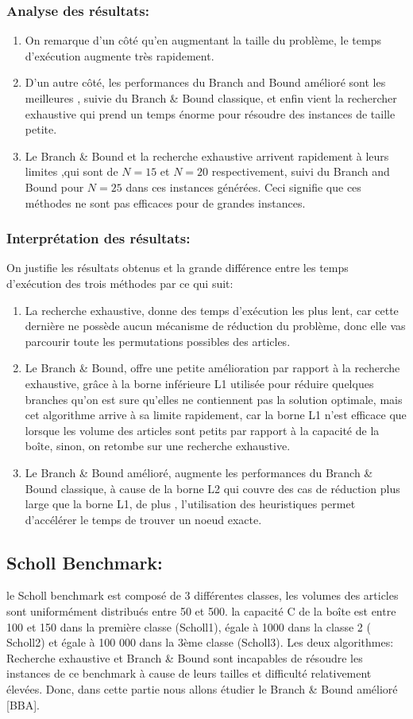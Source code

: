 \documentclass[12pt]{article}
\begin{document}
\subsubsection{Analyse des résultats:}
\begin{enumerate}
    \item On remarque d’un côté qu’en augmentant la taille du problème, le temps d'exécution augmente très rapidement.
    \item D’un autre côté, les performances du Branch and Bound amélioré sont les meilleures , suivie du Branch \& Bound classique, et enfin vient la rechercher exhaustive qui prend un temps énorme pour résoudre des instances de taille petite. 
    \item Le Branch \& Bound et la recherche exhaustive arrivent rapidement à leurs limites ,qui sont de \(N=15\) et \(N=20\) respectivement, suivi du Branch and Bound pour \(N=25\) dans ces instances générées. Ceci signifie que ces méthodes ne sont pas efficaces pour de grandes instances.
\end{enumerate}
\subsubsection{Interprétation des résultats:}
On justifie les résultats obtenus et la grande différence entre les temps d’exécution des trois méthodes par ce qui suit: 
\begin{enumerate}
    \item La recherche exhaustive, donne des temps d'exécution les plus lent, car cette dernière ne possède aucun mécanisme de réduction du problème, donc elle vas parcourir toute les permutations possibles des articles.
    \item Le Branch \& Bound, offre une petite amélioration par rapport à la recherche exhaustive, grâce à la borne inférieure L1 utilisée pour réduire quelques branches qu’on est sure qu’elles ne contiennent pas la solution optimale, mais cet algorithme arrive à sa limite rapidement, car la borne L1 n’est efficace que lorsque les volume des articles sont petits par rapport à la capacité de la boîte, sinon, on retombe sur une recherche exhaustive.
    \item Le Branch \& Bound amélioré, augmente les performances du Branch \& Bound classique, à cause de la borne L2 qui couvre des cas de réduction plus large que la borne L1, de plus , l’utilisation des heuristiques permet d'accélérer le temps de trouver un noeud exacte.
\end{enumerate}
\subsection{Scholl Benchmark:}
le Scholl benchmark est composé de 3 différentes classes, les volumes des articles sont uniformément distribués entre 50 et 500. la capacité C de la boîte est entre 100 et 150 dans la première classe (Scholl1), égale à 1000 dans la classe 2 ( Scholl2) et égale à 100 000 dans la 3ème classe (Scholl3). 
Les deux algorithmes: Recherche exhaustive et Branch \& Bound sont incapables de résoudre les instances de ce benchmark à cause de leurs tailles et difficulté relativement élevées. Donc, dans cette partie nous allons étudier le Branch \& Bound amélioré [BBA]. 
\end{document}
